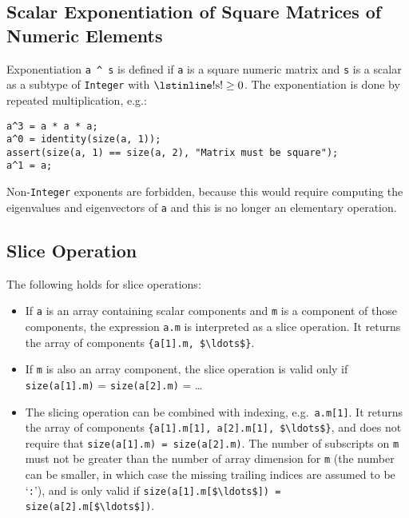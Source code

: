 \subsection{Scalar Exponentiation of Square Matrices of Numeric Elements}\label{scalar-exponentiation-of-square-matrices-of-numeric-elements}

Exponentiation \lstinline!a ^ s! is defined if \lstinline!a! is a square numeric matrix and \lstinline!s! is a scalar as a subtype of \lstinline!Integer!
with $\text{\lstinline!s!} \geq 0$.  The exponentiation is done by repeated multiplication, e.g.:
\begin{lstlisting}[language=modelica]
a^3 = a * a * a;
a^0 = identity(size(a, 1));
assert(size(a, 1) == size(a, 2), "Matrix must be square");
a^1 = a;
\end{lstlisting}

\begin{nonnormative}
Non-\lstinline!Integer! exponents are forbidden, because this would require
computing the eigenvalues and eigenvectors of \lstinline!a! and this is no
longer an elementary operation.
\end{nonnormative}

\subsection{Slice Operation}\label{slice-operation}

The following holds for slice operations:
\begin{itemize}
\item
  If \lstinline!a! is an array containing scalar components and \lstinline!m! is a component of those components, the expression \lstinline!a.m! is interpreted as a
  slice operation.  It returns the array of components \lstinline!{a[1].m, $\ldots$}!.
\item
  If \lstinline!m! is also an array component, the slice operation is valid only if \lstinline!size(a[1].m)! = \lstinline!size(a[2].m)! = \ldots
\item
  The slicing operation can be combined with indexing, e.g.\ \lstinline!a.m[1]!.  It returns the array of components \lstinline!{a[1].m[1], a[2].m[1], $\ldots$}!,
  and does not require that \lstinline!size(a[1].m) = size(a[2].m)!.  The number of subscripts on \lstinline!m! must not be greater than the number of array dimension
  for \lstinline!m! (the number can be smaller, in which case the missing trailing indices are assumed to be `\lstinline!:!'), and is only valid if
  \lstinline!size(a[1].m[$\ldots$]) = size(a[2].m[$\ldots$])!.
\end{itemize}

